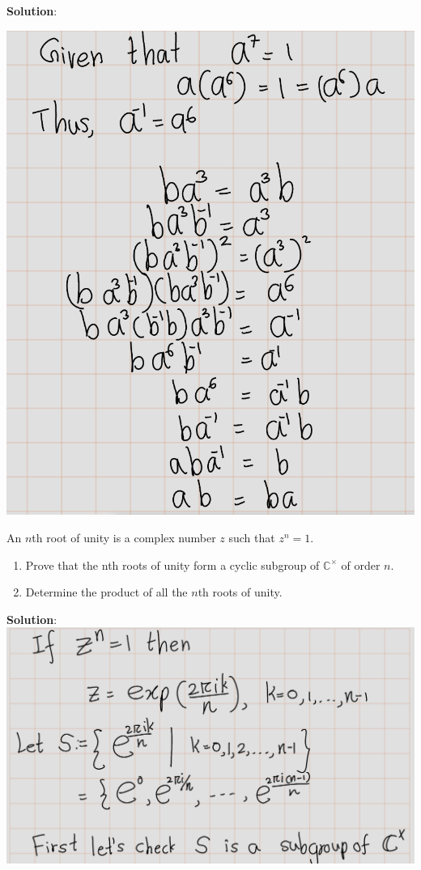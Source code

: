 \documentclass[
]{book}
\providecommand{\tightlist}{%
  \setlength{\itemsep}{0pt}\setlength{\parskip}{0pt}}
\begin{document}
\textbf{Solution}:

\includegraphics{figures/ch_2/fig22.png}

\leavevmode{}%
An \(n\)th root of unity is a complex number \(z\) such that
\(z^n = 1\).

\begin{enumerate}
\def\labelenumi{(\alph{enumi})}
\tightlist
\item
  Prove that the nth roots of unity form a cyclic subgroup of
  \(\mathbb{C}^\times\) of order \(n\).
\item
  Determine the product of all the \(n\)th roots of unity.
\end{enumerate}

\textbf{Solution}: \includegraphics{figures/ch_2/fig23.png}
\end{document}
